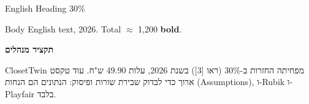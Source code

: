\documentclass[a4paper,11pt]{article}
\begin{document}
{\headfont\Large English Heading 30\%}\par
Body English text, 2026. Total $\approx$ 1,200 \textbf{bold}.\par
\begin{hebrew}
\textbf{תקציר מנהלים}\par
ClosetTwin מפחיתה החזרות ב-30\% (ראו [3]) בשנת 2026, עלות 49.90 ש"ח. עוד טקסט ארוך כדי לבדוק שבירת שורות ופיסוק: הנתונים הם הנחות (Assumptions), ו-Rubik ו-Playfair בלבד.
\end{hebrew}
\end{document}
